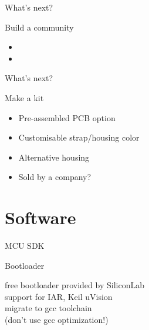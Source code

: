 \documentclass[compress,red]{beamer}
\begin{document}
\begin{frame}{What's next?}

  \begin{block}{Build a community}
    \begin{itemize}
    \item 
    \item 
    \end{itemize}
  \end{block}
  \note[item]{}

\end{frame}

\begin{frame}{What's next?}

  \begin{block}{Make a kit}
    \begin{itemize}
    \item Pre-assembled PCB option
    \item Customisable strap/housing color
    \item Alternative housing
    \item Sold by a company?
    \end{itemize}
  \end{block}

  \note[item]{}

\end{frame}

\section{Software}

\begin{frame}{MCU SDK}
 
\end{frame}


\begin{frame}{Bootloader}
 \begin{center}
  free bootloader provided by SiliconLab \\
  support for IAR, Keil uVision \\
  migrate to gcc toolchain\\
  
  (don't use gcc optimization!)
 \end{center}
 
\end{frame}
\end{document}
